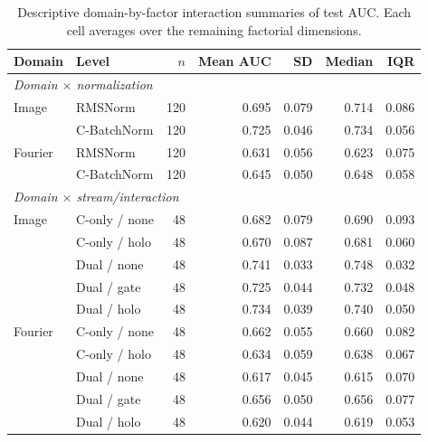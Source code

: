 \begin{table}[t]
\centering
\caption{Descriptive domain-by-factor interaction summaries of test AUC. Each cell averages over the remaining factorial dimensions.}
\label{tab:factor-effects-interactions}
\small
\begin{tabular}{llrrrrr}
\toprule
Domain & Level & $n$ & Mean AUC & SD & Median & IQR \\
\midrule
\multicolumn{7}{l}{\textit{Domain $\times$ normalization}} \\
Image & RMSNorm & 120 & 0.695 & 0.079 & 0.714 & 0.086 \\
 & C-BatchNorm & 120 & 0.725 & 0.046 & 0.734 & 0.056 \\
Fourier & RMSNorm & 120 & 0.631 & 0.056 & 0.623 & 0.075 \\
 & C-BatchNorm & 120 & 0.645 & 0.050 & 0.648 & 0.058 \\
\midrule
\multicolumn{7}{l}{\textit{Domain $\times$ stream/interaction}} \\
Image & C-only / none & 48 & 0.682 & 0.079 & 0.690 & 0.093 \\
 & C-only / holo & 48 & 0.670 & 0.087 & 0.681 & 0.060 \\
 & Dual / none & 48 & 0.741 & 0.033 & 0.748 & 0.032 \\
 & Dual / gate & 48 & 0.725 & 0.044 & 0.732 & 0.048 \\
 & Dual / holo & 48 & 0.734 & 0.039 & 0.740 & 0.050 \\
Fourier & C-only / none & 48 & 0.662 & 0.055 & 0.660 & 0.082 \\
 & C-only / holo & 48 & 0.634 & 0.059 & 0.638 & 0.067 \\
 & Dual / none & 48 & 0.617 & 0.045 & 0.615 & 0.070 \\
 & Dual / gate & 48 & 0.656 & 0.050 & 0.656 & 0.077 \\
 & Dual / holo & 48 & 0.620 & 0.044 & 0.619 & 0.053 \\
\bottomrule
\end{tabular}
\end{table}
